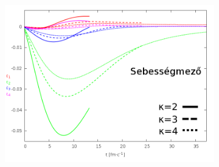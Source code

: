 \documentclass{beamer}
\begin{document}
\begin{frame}
\begin{center}
\begin{figure}[H]
\begin{subfigure}[b]{0.49\textwidth}
        	\includegraphics[width=\textwidth]{pic/res/rel/eps_kappa_v}
	\end{subfigure}
\end{figure}
\end{center}
\end{frame}
\end{document}
